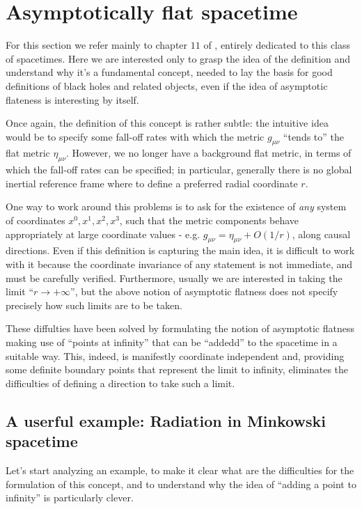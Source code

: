 \section{Asymptotically flat spacetime}
For this section we refer mainly to chapter \(11\) of \cite{wald1991general}, entirely dedicated to this class of spacetimes.
Here we are interested only to grasp the idea of the definition and understand why it's a fundamental concept, needed to lay the basis for good definitions of black holes and related objects, even if the idea of asymptotic flateness is interesting by itself.

Once again, the definition of this concept is rather subtle: the intuitive idea would be to specify some fall-off rates with which the metric \(g_{\mu\nu}\) ``tends to'' the flat metric  \(\eta_{\mu\nu}\). However, we no longer have a background flat metric, in terms of which the fall-off rates can be specified; in particular, generally there is no global inertial reference frame where to define a preferred radial coordinate \(r\).

One way to work around this problems is to ask for the existence of \emph{any} system of coordinates \(x^0, x^1, x^2, x^3\), such that the metric components behave appropriately at large coordinate values - e.g. \(g_{\mu\nu} = \eta_{\mu\nu} + O(1/r)\), along causal directions.
Even if this definition  is capturing the main idea, it is difficult to work with it because the coordinate invariance of any statement is not immediate, and must be carefully verified.
Furthermore, usually we are interested in taking the limit ``\(r \rightarrow +\infty\)'', but the above notion of asymptotic flatness does not specify precisely how such limits are to be taken.

These diffulties have been solved by formulating the notion of asymptotic flatness making use of ``points at infinity'' that can be ``addedd'' to the spacetime in a suitable way. This, indeed, is manifestly coordinate independent and, providing some definite boundary points that represent the limit to infinity, eliminates the difficulties of defining a direction to take such a limit.

\subsection{A userful example: Radiation in Minkowski spacetime}
Let's start analyzing an example, to make it clear what are the difficulties for the formulation of this concept, and to understand why the idea of ``adding a point to infinity'' is particularly clever.

